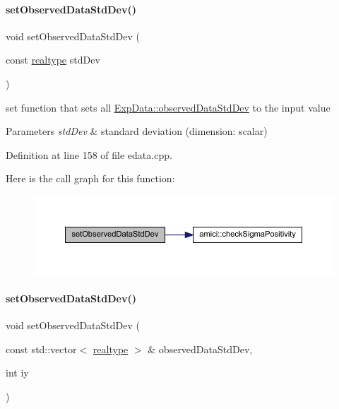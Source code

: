 \paragraph{\texorpdfstring{setObservedDataStdDev()}{setObservedDataStdDev()}\hspace{0.1cm}{\footnotesize\ttfamily [2/4]}}
{\footnotesize\ttfamily void set\+Observed\+Data\+Std\+Dev (\begin{DoxyParamCaption}\item[{const \mbox{\hyperlink{namespaceamici_a1bdce28051d6a53868f7ccbf5f2c14a3}{realtype}}}]{std\+Dev }\end{DoxyParamCaption})}

set function that sets all \mbox{\hyperlink{classamici_1_1_exp_data_aa097568cebb4be48c4c1dfaab0c2a159}{Exp\+Data\+::observed\+Data\+Std\+Dev}} to the input value


\begin{DoxyParams}{Parameters}
{\em std\+Dev} & standard deviation (dimension\+: scalar) \\
\hline
\end{DoxyParams}


Definition at line 158 of file edata.\+cpp.

Here is the call graph for this function\+:
\nopagebreak
\begin{figure}[H]
\begin{center}
\leavevmode
\includegraphics[width=350pt]{classamici_1_1_exp_data_ae6ed832b9bee1861d233c90d5a37c677_cgraph}
\end{center}
\end{figure}
\mbox{\label{classamici_1_1_exp_data_a90948c75e8ce51cd69be08a92215e6c2}} 
\paragraph{\texorpdfstring{setObservedDataStdDev()}{setObservedDataStdDev()}\hspace{0.1cm}{\footnotesize\ttfamily [3/4]}}
{\footnotesize\ttfamily void set\+Observed\+Data\+Std\+Dev (\begin{DoxyParamCaption}\item[{const std\+::vector$<$ \mbox{\hyperlink{namespaceamici_a1bdce28051d6a53868f7ccbf5f2c14a3}{realtype}} $>$ \&}]{observed\+Data\+Std\+Dev,  }\item[{int}]{iy }\end{DoxyParamCaption})}

